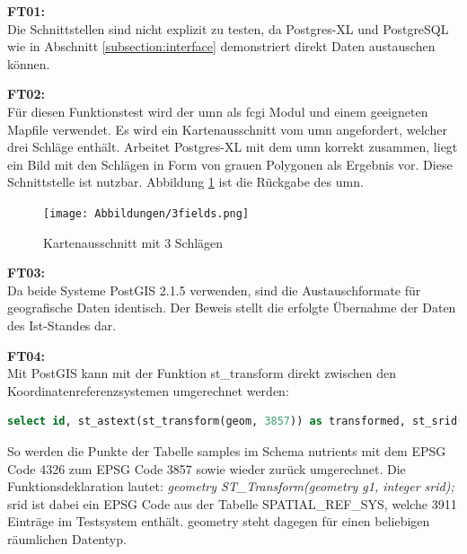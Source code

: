 \textbf{FT01:}\\
Die Schnittstellen sind nicht explizit zu testen, da Postgres-XL und PostgreSQL wie in Abschnitt \ref{subsection:interface} demonstriert direkt Daten austauschen können.

\textbf{FT02:}\\
Für diesen Funktionstest wird der \Gls{umn} als \Gls{fcgi} Modul und einem geeigneten Mapfile verwendet.
Es wird ein Kartenausschnitt vom \Gls{umn} angefordert, welcher drei Schläge enthält.
Arbeitet Postgres-XL mit dem \Gls{umn} korrekt zusammen, liegt ein Bild mit den Schlägen in Form von  grauen Polygonen als Ergebnis vor.
Diese Schnittstelle ist nutzbar.
Abbildung \ref{fig:3fields} ist die Rückgabe des \Gls{umn}.
\begin{figure}[h!]
\centering
\texttt{[image: Abbildungen/3fields.png]}
\caption[Kartenausschnitt mit 3 Schlägen]{Kartenausschnitt mit 3 Schlägen}
\label{fig:3fields}
\end{figure}

\textbf{FT03:}\\
Da beide Systeme PostGIS 2.1.5 verwenden, sind die Austauschformate für geografische Daten identisch.
Der Beweis stellt die erfolgte Übernahme der Daten des Ist-Standes dar.

\textbf{FT04:}\\
Mit PostGIS kann mit der Funktion st\_{}transform direkt zwischen den Koordinatenreferenzsystemen umgerechnet werden:
\begin{lstlisting}[language=sql,caption={SQL Query zur Umrechnung zwischen Koordinatenreferenzsystemen},label=lst:sttransform]
select id, st_astext(st_transform(geom, 3857)) as transformed, st_srid(st_transform(geom, 3857)) as newsrid, st_astext(st_transform(st_transform(geom, 3857), 4326)) as original, st_srid(st_transform(st_transform(geom, 3857), 4326)) as srid from nutrients.samples limit 10;
\end{lstlisting}
So werden die Punkte der Tabelle samples im Schema nutrients mit dem EPSG Code 4326 zum EPSG Code 3857 sowie wieder zurück umgerechnet.
Die Funktionsdeklaration lautet:
\textit{geometry ST\_{}Transform(geometry g1, integer srid);}\\
srid ist dabei ein EPSG Code aus der Tabelle SPATIAL\_{}REF\_{}SYS, welche 3911 Einträge im Testsystem enthält.
geometry steht dagegen für einen beliebigen räumlichen Datentyp.

